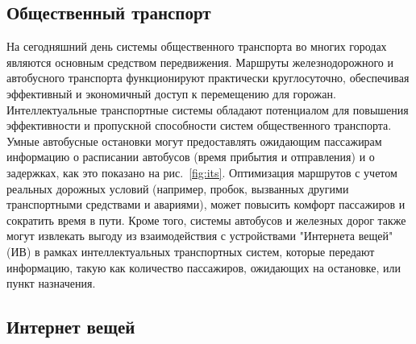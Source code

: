 \subsection*{Общественный транспорт}

На сегодняшний день системы общественного транспорта во многих городах являются основным средством передвижения. Маршруты железнодорожного и автобусного транспорта функционируют практически круглосуточно, обеспечивая эффективный и экономичный доступ к перемещению для горожан. Интеллектуальные транспортные системы обладают потенциалом для повышения эффективности и пропускной способности систем общественного транспорта. Умные автобусные остановки могут предоставлять ожидающим пассажирам информацию о расписании автобусов (время прибытия и отправления) и о задержках, как это показано на рис.~\ref{fig:its}. Оптимизация маршрутов с учетом реальных дорожных условий (например, пробок, вызванных другими транспортными средствами и авариями), может повысить комфорт пассажиров и сократить время в пути. Кроме того, системы автобусов и железных дорог также могут извлекать выгоду из взаимодействия с устройствами "Интернета вещей" (ИВ) в рамках интеллектуальных транспортных систем, которые передают информацию, такую как количество пассажиров, ожидающих на остановке, или пункт назначения.

\subsection*{Интернет вещей}

